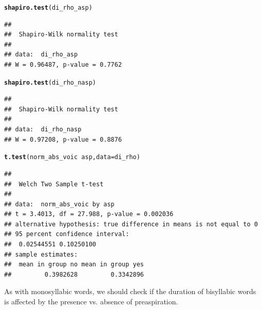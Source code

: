 \documentclass[a4paper,11pt]{article}\usepackage[]{graphicx}\usepackage[]{color}
\makeatletter
\newcommand{\hlopt}[1]{\textcolor[rgb]{0,0,0}{#1}}%
\newcommand{\hlstd}[1]{\textcolor[rgb]{0.345,0.345,0.345}{#1}}%
\newcommand{\hlkwc}[1]{\textcolor[rgb]{0.333,0.667,0.333}{#1}}%
\newcommand{\hlkwd}[1]{\textcolor[rgb]{0.737,0.353,0.396}{\textbf{#1}}}%
\newenvironment{kframe}{%
 \def\at@end@of@kframe{}%
 \ifinner\ifhmode%
  \def\at@end@of@kframe{\end{minipage}}%
  \begin{minipage}{\columnwidth}%
 \fi\fi%
 \def\FrameCommand##1{\hskip\@totalleftmargin \hskip-\fboxsep
 \colorbox{shadecolor}{##1}\hskip-\fboxsep
     \hskip-\linewidth \hskip-\@totalleftmargin \hskip\columnwidth}%
 \MakeFramed {\advance\hsize-\width
   \@totalleftmargin\z@ \linewidth\hsize
   \@setminipage}}%
 {\par\unskip\endMakeFramed%
 \at@end@of@kframe}
\newenvironment{knitrout}{}{} %
\makeatother
\begin{document}
\begin{knitrout}
\color{fgcolor}\begin{kframe}
\begin{alltt}
\hlkwd{shapiro.test}\hlstd{(di_rho_asp)}
\end{alltt}
\begin{verbatim}
## 
## 	Shapiro-Wilk normality test
## 
## data:  di_rho_asp
## W = 0.96487, p-value = 0.7762
\end{verbatim}
\begin{alltt}
\hlkwd{shapiro.test}\hlstd{(di_rho_nasp)}
\end{alltt}
\begin{verbatim}
## 
## 	Shapiro-Wilk normality test
## 
## data:  di_rho_nasp
## W = 0.97208, p-value = 0.8876
\end{verbatim}
\begin{alltt}
\hlkwd{t.test}\hlstd{(norm_abs_voic} \hlopt{~} \hlstd{asp,} \hlkwc{data} \hlstd{= di_rho)}
\end{alltt}
\begin{verbatim}
## 
## 	Welch Two Sample t-test
## 
## data:  norm_abs_voic by asp
## t = 3.4013, df = 27.988, p-value = 0.002036
## alternative hypothesis: true difference in means is not equal to 0
## 95 percent confidence interval:
##  0.02544551 0.10250100
## sample estimates:
##  mean in group no mean in group yes 
##         0.3982628         0.3342896
\end{verbatim}
\end{kframe}
\end{knitrout}

As with monosyllabic words, we should check if the duration of bisyllabic words is affected by the presence vs. absence of preaspiration.
\end{document}
